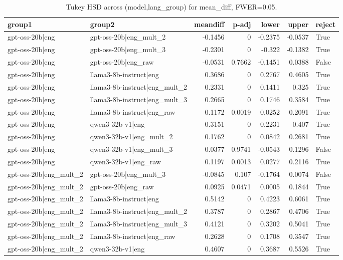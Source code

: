 \begin{table}
\caption{Tukey HSD across (model,lang_group) for mean_diff, FWER=0.05.}
\label{tab:tukey_langgroups_mean_diff}
\begin{tabular}{l l r r r r l}
\toprule
group1 & group2 & meandiff & p-adj & lower & upper & reject \\
\midrule
gpt-oss-20b|eng & gpt-oss-20b|eng_mult_2 & -0.1456 & 0 & -0.2375 & -0.0537 & True \\
gpt-oss-20b|eng & gpt-oss-20b|eng_mult_3 & -0.2301 & 0 & -0.322 & -0.1382 & True \\
gpt-oss-20b|eng & gpt-oss-20b|eng_raw & -0.0531 & 0.7662 & -0.1451 & 0.0388 & False \\
gpt-oss-20b|eng & llama3-8b-instruct|eng & 0.3686 & 0 & 0.2767 & 0.4605 & True \\
gpt-oss-20b|eng & llama3-8b-instruct|eng_mult_2 & 0.2331 & 0 & 0.1411 & 0.325 & True \\
gpt-oss-20b|eng & llama3-8b-instruct|eng_mult_3 & 0.2665 & 0 & 0.1746 & 0.3584 & True \\
gpt-oss-20b|eng & llama3-8b-instruct|eng_raw & 0.1172 & 0.0019 & 0.0252 & 0.2091 & True \\
gpt-oss-20b|eng & qwen3-32b-v1|eng & 0.3151 & 0 & 0.2231 & 0.407 & True \\
gpt-oss-20b|eng & qwen3-32b-v1|eng_mult_2 & 0.1762 & 0 & 0.0842 & 0.2681 & True \\
gpt-oss-20b|eng & qwen3-32b-v1|eng_mult_3 & 0.0377 & 0.9741 & -0.0543 & 0.1296 & False \\
gpt-oss-20b|eng & qwen3-32b-v1|eng_raw & 0.1197 & 0.0013 & 0.0277 & 0.2116 & True \\
gpt-oss-20b|eng_mult_2 & gpt-oss-20b|eng_mult_3 & -0.0845 & 0.107 & -0.1764 & 0.0074 & False \\
gpt-oss-20b|eng_mult_2 & gpt-oss-20b|eng_raw & 0.0925 & 0.0471 & 0.0005 & 0.1844 & True \\
gpt-oss-20b|eng_mult_2 & llama3-8b-instruct|eng & 0.5142 & 0 & 0.4223 & 0.6061 & True \\
gpt-oss-20b|eng_mult_2 & llama3-8b-instruct|eng_mult_2 & 0.3787 & 0 & 0.2867 & 0.4706 & True \\
gpt-oss-20b|eng_mult_2 & llama3-8b-instruct|eng_mult_3 & 0.4121 & 0 & 0.3202 & 0.5041 & True \\
gpt-oss-20b|eng_mult_2 & llama3-8b-instruct|eng_raw & 0.2628 & 0 & 0.1708 & 0.3547 & True \\
gpt-oss-20b|eng_mult_2 & qwen3-32b-v1|eng & 0.4607 & 0 & 0.3687 & 0.5526 & True \\

\end{tabular}
\end{table}
